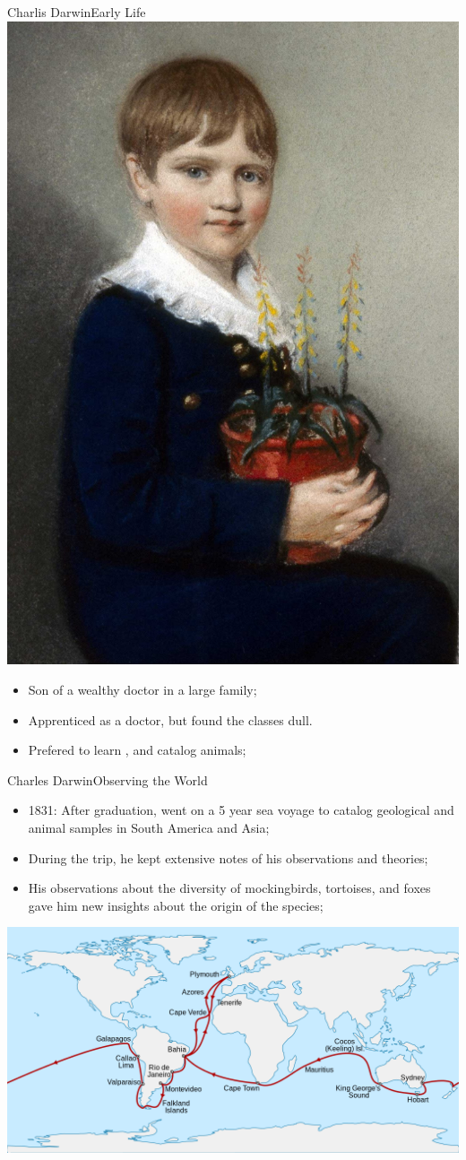 \begin{frame}{Charlis Darwin}{Early Life}
  \hfill\includegraphics[width=.2\textwidth]{../img/wikipedia_darwinchild}
  \bigskip

  \begin{itemize}
    \item Son of a wealthy doctor in a large family;
    \item Apprenticed as a doctor, but found the classes dull.
    \item Prefered to learn , and catalog animals;
  \end{itemize}
\end{frame}

\begin{frame}{Charles Darwin}{Observing the World}
  \begin{itemize}
    \item 1831: After graduation, went on a 5 year sea voyage to catalog geological and animal samples in South America and Asia;\medskip

    \item During the trip, he kept extensive notes of his observations and theories;\medskip

    \item His observations about the diversity of mockingbirds, tortoises, and foxes gave him new insights about the origin of the species;
  \end{itemize}\bigskip

  \begin{center}
    \includegraphics[width=.6\textwidth]{../img/wikipedia_darwin_beagle}
  \end{center}
\end{frame}

